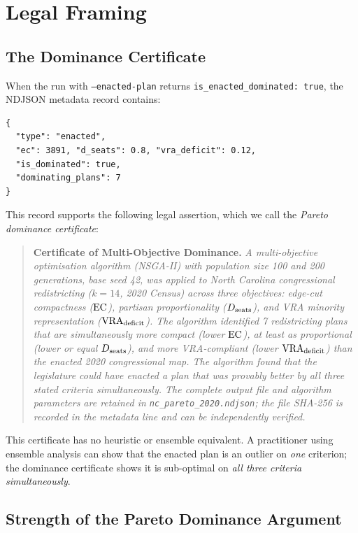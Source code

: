 \section{Legal Framing}
\label{sec:legal}

\subsection{The Dominance Certificate}

When the \nsga{} run with \texttt{--enacted-plan} returns
\texttt{is\_enacted\_dominated: true}, the NDJSON metadata record contains:

\begin{verbatim}
{
  "type": "enacted",
  "ec": 3891, "d_seats": 0.8, "vra_deficit": 0.12,
  "is_dominated": true,
  "dominating_plans": 7
}
\end{verbatim}

This record supports the following legal assertion, which we call the
\emph{Pareto dominance certificate}:

\begin{quote}
\textbf{Certificate of Multi-Objective Dominance.}
\textit{A multi-objective optimisation algorithm (NSGA-II) with population size
100 and 200 generations, base seed 42, was applied to North Carolina
congressional redistricting ($k=14$, 2020 Census) across three objectives:
edge-cut compactness ($\mathrm{EC}$), partisan proportionality ($D_{\mathrm{seats}}$), and
VRA minority representation ($\mathrm{VRA}_{\mathrm{deficit}}$).
The algorithm identified 7 redistricting plans that are simultaneously more
compact (lower $\mathrm{EC}$), at least as proportional (lower or equal $D_{\mathrm{seats}}$),
and more VRA-compliant (lower $\mathrm{VRA}_{\mathrm{deficit}}$) than the enacted 2020 congressional
map.
The algorithm found that the legislature could have enacted a plan that was
provably better by all three stated criteria simultaneously.
The complete output file and algorithm parameters are retained in
\texttt{nc\_pareto\_2020.ndjson}; the file SHA-256 is recorded in the
metadata line and can be independently verified.}
\end{quote}

This certificate has no heuristic or ensemble equivalent.
A practitioner using ensemble analysis can show that the enacted plan is an
outlier on \emph{one} criterion; the dominance certificate shows it is
sub-optimal on \emph{all three criteria simultaneously}.

\subsection{Strength of the Pareto Dominance Argument}

